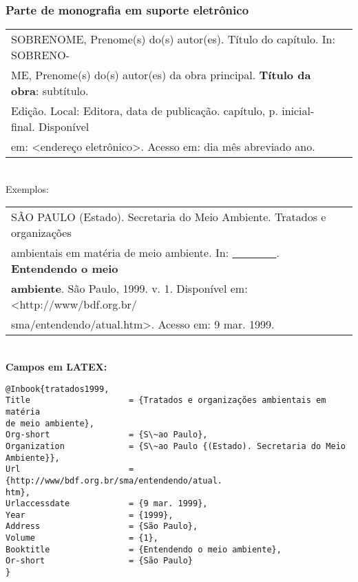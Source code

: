 \subsubsection{Parte de monografia em suporte eletrônico}
		  	  
\begin{tabular}{|l|c|} \hline
	SOBRENOME, Prenome(s) do(s) autor(es). Título do capítulo. In: 
	SOBRENO-                                                         \\ME, Prenome(s)  do(s) autor(es) da obra principal.  \textbf{Título da obra}: subtítulo. \\Edição. Local: Editora, data de publicação. capítulo, p. inicial-final. Disponível \\em: <endereço eletrônico>. Acesso em: dia mês abreviado ano.  \\\hline
\end{tabular} \\ 
		   
Exemplos: \\ 
		   	
\begin{tabular}{|l|c|} \hline
	SÃO PAULO (Estado). Secretaria do Meio Ambiente. Tratados e organizações \\ ambientais em matéria de meio ambiente. In: \underline{\ \ \ \ \ \ \ \ }. \textbf{Entendendo o meio} \\\textbf{ambiente}. São Paulo, 1999. v. 1. Disponível em: <http://www/bdf.org.br/\\sma/entendendo/atual.htm>. Acesso em: 9 mar.
	1999.                                                                       \\\hline
\end{tabular} \\ 
		   	
\textbf{Campos em LATEX:} 
		   	
\begingroup
\fontsize{10pt}{12pt}\selectfont
\begin{verbatim}
@Inbook{tratados1999,
Title                    = {Tratados e organizações ambientais em matéria 
de meio ambiente},
Org-short                = {S\~ao Paulo},
Organization             = {S\~ao Paulo {(Estado). Secretaria do Meio 
Ambiente}},
Url                      = {http://www/bdf.org.br/sma/entendendo/atual.
htm},
Urlaccessdate            = {9 mar. 1999},
Year                     = {1999},
Address                  = {São Paulo},
Volume                   = {1},
Booktitle                = {Entendendo o meio ambiente},
Or-short                 = {São Paulo}
}
\end{verbatim}
\endgroup
		   	

